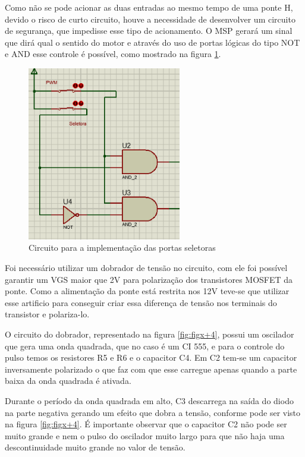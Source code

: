 Como não se pode acionar as duas entradas ao mesmo tempo de uma ponte H, devido o risco de curto circuito, houve a necessidade de desenvolver um circuito de segurança, que impedisse esse tipo de acionamento. O MSP gerará um sinal que dirá qual o sentido do motor e através do uso de portas lógicas do tipo NOT e AND esse controle é possível, como mostrado na figura \ref{fig:circuito_seletora}.

\begin{figure}[!h]
  \center
  \includegraphics[width=0.6\textwidth]{figuras/resultados/circuito_seletora}
  \caption{Circuito para a implementação das portas seletoras}
  \label{fig:circuito_seletora}
\end{figure}


Foi necessário utilizar um dobrador de tensão no circuito, com ele foi possível garantir um VGS maior que 2V para polarização dos transistores MOSFET da ponte. Como a alimentação da ponte está restrita nos 12V teve-se que utilizar esse artificio para conseguir criar essa diferença de tensão nos terminais do transistor e polariza-lo.

O circuito do dobrador, representado na figura \ref{fig:figx+4}, possui um oscilador que gera uma onda quadrada, que no caso é um CI 555, e para o controle do pulso temos os resistores R5 e R6 e o capacitor C4. Em C2 tem-se um capacitor inversamente polarizado o que faz com que esse carregue apenas quando a parte baixa da onda quadrada é ativada.

Durante o período da onda quadrada em alto, C3 descarrega na saída do diodo na parte negativa gerando um efeito que dobra a tensão, conforme pode ser visto na figura \ref{fig:figx+4}. É importante observar que o capacitor C2 não pode ser muito grande e nem o pulso do oscilador muito largo para que não haja uma descontinuidade muito grande no valor de tensão.

